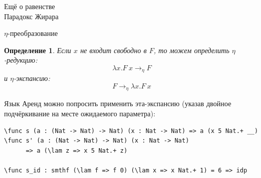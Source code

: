 \documentclass[aspectratio=169,dvipsnames,usenames]{beamer}
\begin{document}
\newtheorem{dfn}{Определение}[section]
\newtheorem{nte}{Замечание}[section]

\newtheorem{axiom}{Аксиома}[section]
\newtheorem{thm}{Теорема}[section]
\newtheorem{lmm}[theorem]{Лемма}
\newtheorem{statement}{Утверждение}[section]
\newtheorem{oun_paragraph}{Пункт}[section]
\newtheorem{cons}{Следствие}[section]
\newtheorem*{exm}{Пример}

\newcommand{\comb}[1]{\operatorname{\mathcal{#1}}}
\newcommand{\func}[1]{\operatorname{#1}}
\newcommand{\reduction}[1]{{\color{OrangeRed}#1}}
\newcommand{\set}[1]{\left\{#1\right\}}

\def\from#1{\par \parbox{0.7\textwidth}{\par \hfill\raggedleft \it #1}} 

\begin{frame}{}
\begin{center}
{\LARGE Ещё о равенстве\\Парадокс Жирара}
\end{center}
\end{frame}

\begin{frame}[fragile]{$\eta$-преобразование}
\begin{dfn}
Если $x$ не входит свободно в $F$, то можем определить $\eta$-редукцию:
$$\lambda x.F\ x \rightarrow_\eta F$$
и $\eta$-экспансию:
$$F \rightarrow_\eta \lambda x.F\ x$$
\end{dfn}

Язык Аренд можно попросить применить эта-экспансию (указав двойное подчёркивание
на месте ожидаемого параметра):

\begin{verbatim}
\func s (a : (Nat -> Nat) -> Nat) (x : Nat -> Nat) => a (x 5 Nat.+ __)
\func s' (a : (Nat -> Nat) -> Nat) (x : Nat -> Nat) 
      => a (\lam z => x 5 Nat.+ z)

\func s_id : smthf (\lam f => f 0) (\lam x => x Nat.+ 1) = 6 => idp
\end{verbatim}
\end{frame}
\end{document}
